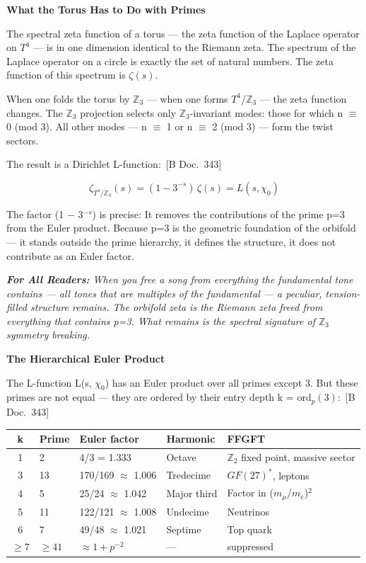 \documentclass[11pt,oneside]{book}
\newcommand{\status}[1]{\penalty10000\,{\scriptsize\textcolor{gray!60}{[#1]}}}
\newenvironment{laierspur}{%
  \par\vspace{4pt}%
  \noindent\small\itshape\color{blue!60!black}%
  \textbf{For All Readers:}\enspace\ignorespaces}{%
  \par\vspace{4pt}\normalsize\normalfont\normalcolor}
\begin{document}
\textbf{What the Torus Has to Do with Primes}

The spectral zeta function of a torus — the zeta function of the Laplace
operator on $T^4$ — is in one dimension identical to the Riemann zeta. The
spectrum of the Laplace operator on a circle is exactly the set of natural
numbers. The zeta function of this spectrum is $\zeta(s)$.

When one folds the torus by $\mathbb{Z}_3$ — when one forms $T^4/\mathbb{Z}_3$ — the
zeta function changes. The $\mathbb{Z}_3$ projection selects only $\mathbb{Z}_3$-invariant
modes: those for which n $\equiv$ 0 (mod 3). All other modes — n $\equiv$ 1
or n $\equiv$ 2 (mod 3) — form the twist sectors.

The result is a Dirichlet L-function: \status{B Doc.~343}

\[\zeta_{T^4/\mathbb{Z}_3}(s) = (1-3^{-s})\,\zeta(s) = L(s,\chi_0)\]

The factor (1 $-$ 3$^{-s}$) is precise: It removes the contributions of the
prime p=3 from the Euler product. Because p=3 is the geometric foundation
of the orbifold — it stands outside the prime hierarchy, it defines the
structure, it does not contribute as an Euler factor.

\begin{laierspur}
When you free a song from everything the fundamental tone contains — all
tones that are multiples of the fundamental — a peculiar, tension-filled
structure remains. The orbifold zeta is the Riemann zeta freed from
everything that contains p=3. What remains is the spectral signature of
$\mathbb{Z}_3$ symmetry breaking.
\end{laierspur}

\textbf{The Hierarchical Euler Product}

The L-function L(s, $\chi_0$) has an Euler product over all primes except 3.
But these primes are not equal — they are ordered by their entry depth
k = $\text{ord}_p(3)$: \status{B Doc.~343}

\begin{center}
\small
\begin{tabular}{cp{1.2cm}p{2.3cm}p{1.5cm}p{2cm}}
\toprule
k & Prime & Euler factor & Harmonic & FFGFT \\
\midrule
1 & 2 & 4/3 = 1.333 & Octave & $\mathbb{Z}_2$ fixed point, massive sector \\
3 & 13 & 170/169 $\approx$ 1.006 & Tredecime & $GF(27)^*$, leptons \\
4 & 5 & 25/24 $\approx$ 1.042 & Major third & Factor in ($m_\mu$/$m_e$)$^2$ \\
5 & 11 & 122/121 $\approx$ 1.008 & Undecime & Neutrinos \\
6 & 7 & 49/48 $\approx$ 1.021 & Septime & Top quark \\
${\geq}7$ & ${\geq}41$ & ${\approx}1{+}p^{-2}$ & --- & suppressed \\
\bottomrule
\end{tabular}
\end{center}
\end{document}
